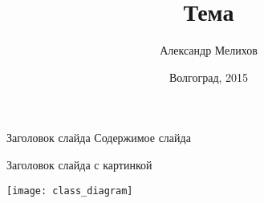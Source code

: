 \documentclass{beamer}
\begin{document}
\title{Тема}  
\author{Александр Мелихов}
\date{Волгоград, 2015} 

\frame{\titlepage} 

\begin{frame}{Заголовок слайда}
    Содержимое слайда
\end{frame}

\begin{frame}{Заголовок слайда с картинкой}
    \begin{center}
        \texttt{[image: class\_diagram]}  
    \end{center}
\end{frame}
\end{document}
